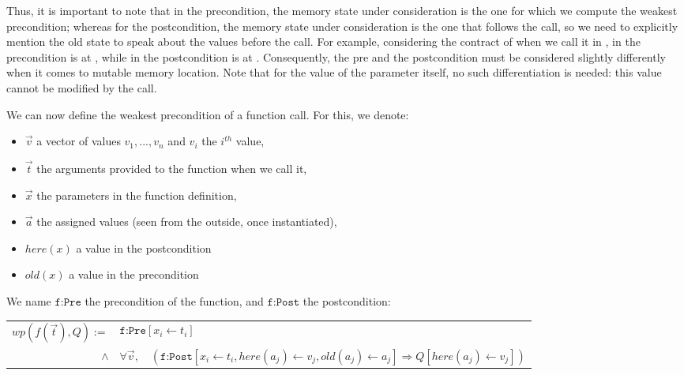 Thus, it is important to note that in the precondition, the memory
state under consideration is the one for which we compute the weakest precondition; whereas for the
postcondition, the memory state under consideration is the one that
follows the call, so we need to explicitly mention the old state to speak
about the values before the call. For example, considering the contract of
 when we call it in ,  in the
precondition is  at , while  in the
postcondition is  at . Consequently, the pre and
the postcondition must be considered slightly differently when it comes to
mutable memory location. Note that for the value of the parameter 
itself, no such differentiation is needed: this value cannot be modified by the
call.




We can now define the weakest precondition of a function call. For this,
we denote:

\begin{itemize}
\item $\vec{v}$ a vector of values $v_1, ..., v_n$ and $v_i$ the $i^{th}$ value,
\item $\vec{t}$ the arguments provided to the function when we call it,
\item $\vec{x}$ the parameters in the function definition,
\item $\vec{a}$ the assigned values (seen from the outside, once instantiated),
\item $here(x)$ a value in the postcondition
\item $old(x)$ a value in the precondition
\end{itemize}

We name $\texttt{f:Pre}$ the precondition of the function, and $\texttt{f:Post}$
the postcondition:



\begin{center}
\begin{tabular}{rl}
  $wp( f(\vec{t}), Q ) :=$ & $\texttt{f:Pre}[x_i \leftarrow t_i]$ \\
  $\wedge$ & $\forall \vec{v}, \quad (
              \texttt{f:Post}[x_i \leftarrow t_i,
                              here(a_j) \leftarrow v_j,
                              old(a_j) \leftarrow a_j] \Rightarrow
              Q[here(a_j) \leftarrow v_j])$
\end{tabular}
\end{center}


